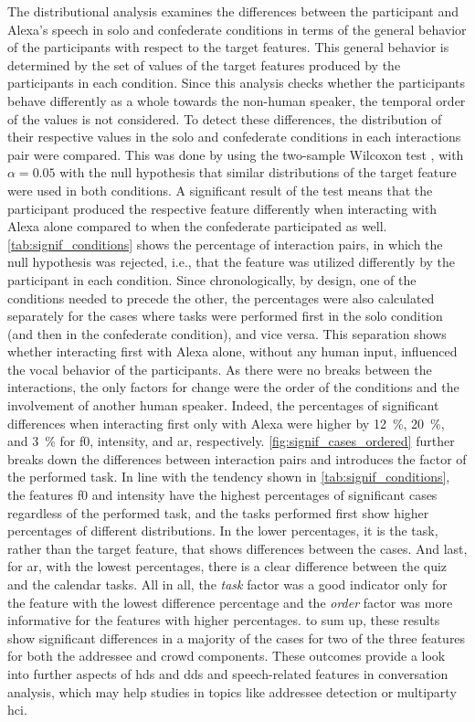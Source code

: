 The distributional analysis examines the differences between the participant and Alexa's speech in solo and confederate conditions in terms of the general behavior of the participants with respect to the target features.
This general behavior is determined by the set of values of the target features produced by the participants in each condition.
Since this analysis checks whether the participants behave differently as a whole towards the non-human speaker, the temporal order of the values is not considered.
To detect these differences, the distribution of their respective values in the solo and confederate conditions in each interactions pair were compared.
This was done by using the two-sample Wilcoxon test \citep{Wilcoxon1945individual}, with $\alpha = 0.05$ with the null hypothesis that similar distributions of the target feature were used in both conditions.
A significant result of the test means that the participant produced the respective feature differently when interacting with Alexa alone compared to when the confederate participated as well.
\cref{tab:signif_conditions} shows the percentage of interaction pairs, in which the null hypothesis was rejected, i.e., that the feature was utilized differently by the participant in each condition.
Since chronologically, by design, one of the conditions needed to precede the other, the percentages were also calculated separately for the cases where tasks were performed first in the solo condition (and then in the confederate condition), and vice versa.
This separation shows whether interacting first with Alexa alone, without any human input, influenced the vocal behavior of the participants.
As there were no breaks between the interactions, the only factors for change were the order of the conditions and the involvement of another human speaker.
Indeed, the percentages of significant differences when interacting first only with Alexa were higher by \SI{12}{\percent}, \SI{20}{\percent}, and \SI{3}{\percent} for \ac{f0}, intensity, and \ac{ar}, respectively.
\cref{fig:signif_cases_ordered} further breaks down the differences between interaction pairs and introduces the factor of the performed task.
In line with the tendency shown in \cref{tab:signif_conditions}, the features \ac{f0} and intensity have the highest percentages of significant cases regardless of the performed task, and the tasks performed first show higher percentages of different distributions.
In the lower percentages, it is the task, rather than the target feature, that shows differences between the cases.
And last, for \ac{ar}, with the lowest percentages, there is a clear difference between the quiz and the calendar tasks.
All in all, the \emph{task} factor was a good indicator only for the feature with the lowest difference percentage and the \emph{order} factor was more informative for the features with higher percentages.
to sum up, these results show significant differences in a majority of the cases for two of the three features for both the addressee and crowd components.
These outcomes provide a look into further aspects of \ac{hds} and \ac{dds} and speech-related features in conversation analysis, which may help studies in topics like addressee detection or  multiparty \ac{hci}.

